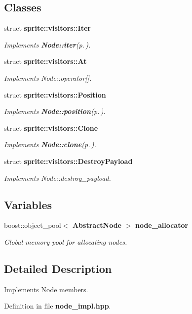 \subsection*{Classes}
\begin{CompactItemize}
\item 
struct {\bf sprite::visitors::Iter}
\begin{CompactList}\small\item\em Implements {\bf Node::iter}{\rm (p.\,\pageref{structsprite_1_1Node_a7})}. \item\end{CompactList}\item 
struct {\bf sprite::visitors::At}
\begin{CompactList}\small\item\em Implements Node::operator[]. \item\end{CompactList}\item 
struct {\bf sprite::visitors::Position}
\begin{CompactList}\small\item\em Implements {\bf Node::position}{\rm (p.\,\pageref{structsprite_1_1Node_a11})}. \item\end{CompactList}\item 
struct {\bf sprite::visitors::Clone}
\begin{CompactList}\small\item\em Implements {\bf Node::clone}{\rm (p.\,\pageref{structsprite_1_1Node_a4})}. \item\end{CompactList}\item 
struct {\bf sprite::visitors::Destroy\-Payload}
\begin{CompactList}\small\item\em Implements Node::destroy\_\-payload. \item\end{CompactList}\end{CompactItemize}
\subsection*{Variables}
\begin{CompactItemize}
\item 
boost::object\_\-pool$<$ {\bf Abstract\-Node} $>$ {\bf node\_\-allocator}\label{namespacesprite_a19}

\begin{CompactList}\small\item\em Global memory pool for allocating nodes. \item\end{CompactList}\end{CompactItemize}


\subsection{Detailed Description}
Implements Node members. 



Definition in file {\bf node\_\-impl.hpp}.